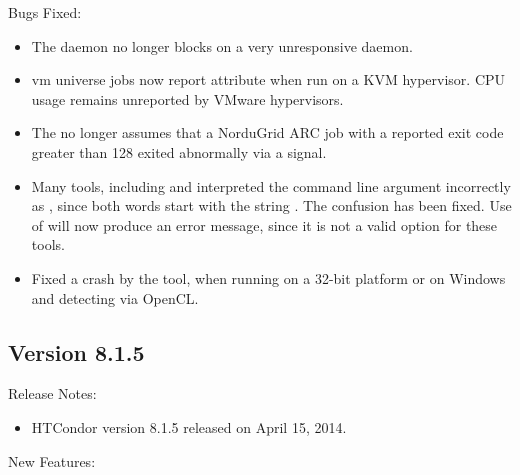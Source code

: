 \noindent Bugs Fixed:

\begin{itemize}

\item The  daemon no longer blocks
on a very unresponsive daemon.

\item vm universe jobs now report attribute  when
run on a KVM hypervisor.
CPU usage remains unreported by VMware hypervisors.

\item The  no longer assumes that a NorduGrid ARC job
with a reported exit code greater than 128 exited abnormally via a signal.

\item Many tools, including  and  interpreted
the command line argument  incorrectly as ,
since both words start with the string .
The confusion has been fixed. 
Use of  will now produce an error message, 
since it is not a valid option for these tools.

\item Fixed a crash by the  tool,
when running on a 32-bit platform or on Windows and detecting via OpenCL.

\end{itemize}

\subsection*{\label{sec:New-8-1-5}Version 8.1.5}

\noindent Release Notes:

\begin{itemize}

\item HTCondor version 8.1.5 released on April 15, 2014.

\end{itemize}


\noindent New Features:

